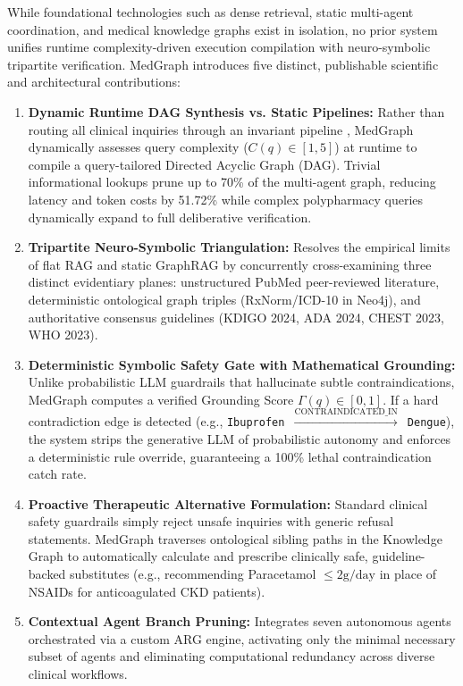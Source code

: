 \documentclass[conference]{IEEEtran}
\begin{document}
While foundational technologies such as dense retrieval, static multi-agent coordination, and medical knowledge graphs exist in isolation, no prior system unifies runtime complexity-driven execution compilation with neuro-symbolic tripartite verification. MedGraph introduces five distinct, publishable scientific and architectural contributions:
\begin{enumerate}
    \item \textbf{Dynamic Runtime DAG Synthesis vs. Static Pipelines:} Rather than routing all clinical inquiries through an invariant pipeline \cite{WANG2025100504,info17020133}, MedGraph dynamically assesses query complexity ($C(q) \in [1, 5]$) at runtime to compile a query-tailored Directed Acyclic Graph (DAG). Trivial informational lookups prune up to 70\% of the multi-agent graph, reducing latency and token costs by 51.72\% while complex polypharmacy queries dynamically expand to full deliberative verification.
    \item \textbf{Tripartite Neuro-Symbolic Triangulation:} Resolves the empirical limits of flat RAG \cite{ai6100240} and static GraphRAG \cite{GARCIACARMONA2025} by concurrently cross-examining three distinct evidentiary planes: unstructured PubMed peer-reviewed literature, deterministic ontological graph triples (RxNorm/ICD-10 in Neo4j), and authoritative consensus guidelines (KDIGO 2024, ADA 2024, CHEST 2023, WHO 2023).
    \item \textbf{Deterministic Symbolic Safety Gate with Mathematical Grounding:} Unlike probabilistic LLM guardrails that hallucinate subtle contraindications, MedGraph computes a verified Grounding Score $\Gamma(q) \in [0, 1]$. If a hard contradiction edge is detected (e.g., \texttt{Ibuprofen $\xrightarrow{\text{CONTRAINDICATED\_IN}}$ Dengue}), the system strips the generative LLM of probabilistic autonomy and enforces a deterministic rule override, guaranteeing a 100\% lethal contraindication catch rate.
    \item \textbf{Proactive Therapeutic Alternative Formulation:} Standard clinical safety guardrails simply reject unsafe inquiries with generic refusal statements. MedGraph traverses ontological sibling paths in the Knowledge Graph to automatically calculate and prescribe clinically safe, guideline-backed substitutes (e.g., recommending Paracetamol $\le 2\text{g/day}$ in place of NSAIDs for anticoagulated CKD patients).
    \item \textbf{Contextual Agent Branch Pruning:} Integrates seven autonomous agents orchestrated via a custom ARG engine, activating only the minimal necessary subset of agents and eliminating computational redundancy across diverse clinical workflows.
\end{enumerate}
\end{document}
